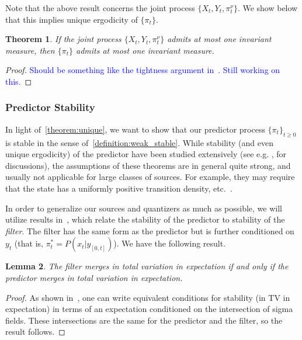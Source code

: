\documentclass{article}
\newtheorem{theorem}{Theorem}[section]
\newtheorem{lemma}[theorem]{Lemma}
\begin{document}
Note that the above result concerns the joint process \( \{X_t,Y_t,\pi_t^\nu \} \). We show below that this implies unique ergodicity of \( \{\pi_t\} \).

\begin{theorem}
    If the joint process \( \{X_t,Y_t,\pi_t^\nu \} \) admits at most one invariant measure, then \( \{\pi_t\} \) admits at most one invariant measure.
\end{theorem}

\begin{proof}
    \textcolor{blue}{Should be something like the tightness argument in~\cite[Theorem 3]{Stettner}. Still working on this.}
\end{proof}

\subsubsection*{Predictor Stability}
In light of~\ref{theorem:unique}, we want to show that our predictor process \( \{\pi_t\}_{t\ge0} \) is stable in the sense of~\ref{definition:weak_stable}. While stability (and even unique ergodicity) of the predictor have been studied extensively (see e.g. \cite{Chigansky}, \cite{DM} for discussions), the assumptions of these theorems are in general quite strong, and usually not applicable for large classes of sources. For example, they may require that the state has a uniformly positive transition density, etc.~\cite{Chigansky}. %

In order to generalize our sources and quantizers as much as possible, we will utilize results in~\cite{Curtis}, which relate the stability of the predictor to stability of the \emph{filter}. The filter has the same form as the predictor but is further conditioned on \( y_t \) (that is, \( \pi_t^* = P(x_t | y_{[0,t]}) \)). We have the following result.

\begin{lemma}\label{lemma:filter-predictor}\cite[Theorem 2.11]{Curtis}
    The filter merges in total variation in expectation if and only if the predictor merges in total variation in expectation.
\end{lemma}

\begin{proof}
    As shown in~\cite{Curtis}, one can write equivalent conditions for stability (in TV in expectation) in terms of an expectation conditioned on the intersection of sigma fields. These intersections are the same for the predictor and the filter, so the result follows.
\end{proof}
\end{document}

